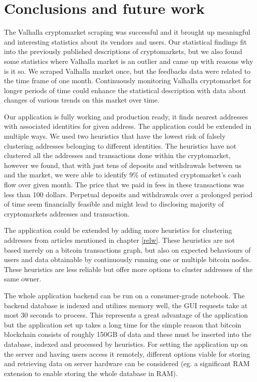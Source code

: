 \documentclass[
  digital, %
  table,   %
  lof,     %
  lot,     %
  oneside
]{fithesis3}
\begin{document}
\chapter{Conclusions and future work}

The Valhalla cryptomarket scraping was successful and
it brought up meaningful and interesting statistics about its vendors and users.
Our statistical findings fit into the previously published descriptions
of cryptomarkets, but we also found some statistics where Valhalla market is an outlier and
came up with reasons why is it so.
We scraped Valhalla market once, but the feedbacks data were
related to the time frame of one month. Continuously monitoring 
Valhalla cryptomarket for longer periods of time could enhance the statistical description
with data about changes of various trends on this market over time.

Our application is fully working and production ready, it 
finds nearest addresses with associated identities for given address.
The application could be extended in multiple ways. We used two
heuristics that have the lowest risk of falsely clustering addresses belonging to different identities.
The heuristics have not clustered all the addresses and transactions done within the cryptomarket,
however we found, that with just tens of deposits and withdrawals between us and the market,
we were able to identify 9\% of estimated cryptomarket's cash flow over given month.
The price that we paid in fees in these transactions was less than 100 dollars. 
Perpetual deposits and withdrawals over a prolonged period of time seem financially feasible
and might lead to disclosing majority of cryptomarkets addresses and transaction.

The application could be extended by adding more heuristics for clustering addresses from articles mentioned
in chapter \ref{relw}.
These heuristics are not based merely on a bitcoin transactions graph, but also
on expected behaviours of users and data obtainable by continuously running one or multiple
bitcoin nodes. These heuristics are less reliable but offer more options to cluster addresses of the same owner.

The whole application backend can be run on a consumer-grade notebook. The backend database is indexed and utilizes memory well,
the GUI requests take at most 30 seconds to process. This represents a great advantage of the application but the application set up takes a long time for the simple reason that bitcoin
blockchain consists of roughly 150GB of data and these must be inserted into the database, indexed
and processed by heuristics.
For setting the application up on the server and having users access it remotely,
different options viable for storing and retrieving data on server hardware
can be considered (eg. a significant RAM extension to enable storing the whole database in RAM). 

\printbibliography{}
\end{document}
